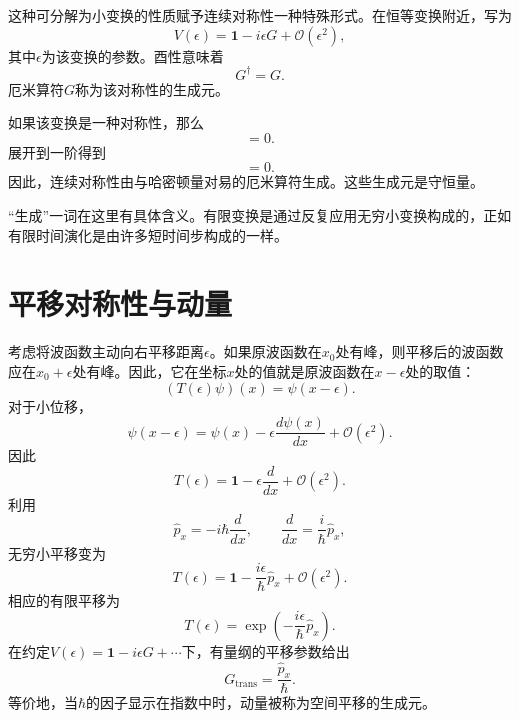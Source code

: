 这种可分解为小变换的性质赋予连续对称性一种特殊形式。在恒等变换附近，写为
\begin{equation}
V(\epsilon)
=
\mathbf 1-i\epsilon G+\mathcal O(\epsilon^2),
\end{equation}
其中\(\epsilon\)为该变换的参数。酉性意味着
\begin{equation}
G^\dagger=G.
\end{equation}
厄米算符\(G\)称为该对称性的生成元。

如果该变换是一种对称性，那么
\begin{equation}
[H,V(\epsilon)]=0.
\end{equation}
展开到一阶得到
\begin{equation}
[H,G]=0.
\end{equation}
因此，连续对称性由与哈密顿量对易的厄米算符生成。这些生成元是守恒量。

``生成''一词在这里有具体含义。有限变换是通过反复应用无穷小变换构成的，正如有限时间演化是由许多短时间步构成的一样。

\section{平移对称性与动量}

考虑将波函数主动向右平移距离\(\epsilon\)。如果原波函数在\(x_0\)处有峰，则平移后的波函数应在\(x_0+\epsilon\)处有峰。因此，它在坐标\(x\)处的值就是原波函数在\(x-\epsilon\)处的取值：
\begin{equation}
(T(\epsilon)\psi)(x)=\psi(x-\epsilon).
\end{equation}
对于小位移，
\begin{equation}
\psi(x-\epsilon)
=
\psi(x)-\epsilon\frac{d\psi(x)}{dx}
+\mathcal O(\epsilon^2).
\end{equation}
因此
\begin{equation}
T(\epsilon)
=
\mathbf 1-\epsilon\frac{d}{dx}
+\mathcal O(\epsilon^2).
\end{equation}
利用
\begin{equation}
\hat p_x=-i\hbar\frac{d}{dx},
\qquad
\frac{d}{dx}=\frac{i}{\hbar}\hat p_x,
\end{equation}
无穷小平移变为
\begin{equation}
T(\epsilon)
=
\mathbf 1-\frac{i\epsilon}{\hbar}\hat p_x
+\mathcal O(\epsilon^2).
\end{equation}
相应的有限平移为
\begin{equation}
T(\epsilon)
=
\exp\left(-\frac{i\epsilon}{\hbar}\hat p_x\right).
\end{equation}
在约定\(V(\epsilon)=\mathbf 1-i\epsilon G+\cdots\)下，有量纲的平移参数给出
\begin{equation}
G_{\mathrm{trans}}=\frac{\hat p_x}{\hbar}.
\end{equation}
等价地，当\(\hbar\)的因子显示在指数中时，动量被称为空间平移的生成元。

